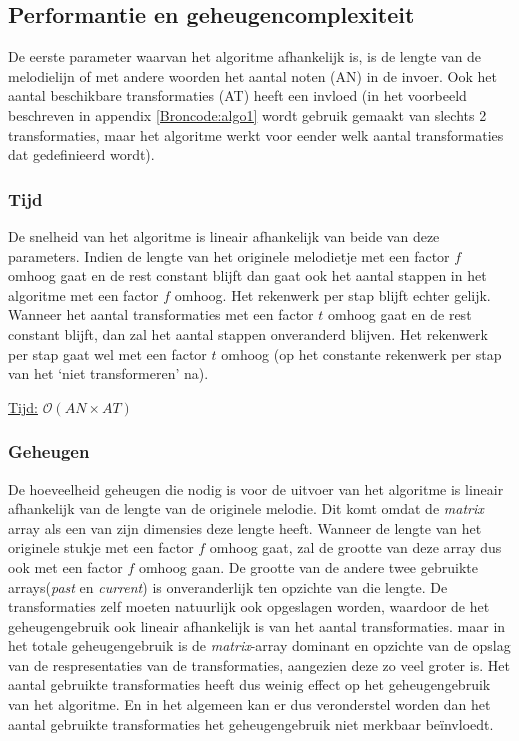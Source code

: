 \subsection{Performantie en geheugencomplexiteit}
De eerste parameter waarvan het algoritme afhankelijk is, is de lengte van de melodielijn of met andere woorden het aantal noten (AN) in de invoer. Ook het aantal beschikbare transformaties (AT) heeft een invloed (in het voorbeeld beschreven in appendix \ref{Broncode:algo1} wordt gebruik gemaakt van slechts 2 transformaties, maar het algoritme werkt voor eender welk aantal transformaties dat gedefinieerd wordt).

\subsubsection{Tijd} 
De snelheid van het algoritme is lineair afhankelijk van beide van deze parameters. Indien de lengte van het originele melodietje met een factor $f$ omhoog gaat en de rest constant blijft dan gaat ook het aantal stappen in het algoritme met een factor $f$ omhoog. Het rekenwerk per stap blijft echter gelijk. Wanneer het aantal transformaties met een factor $t$ omhoog gaat en de rest constant blijft, dan zal het aantal stappen onveranderd blijven. Het rekenwerk per stap gaat wel met een factor $t$ omhoog (op het constante rekenwerk per stap van het `niet transformeren' na).

\begin{center}
\underline{Tijd:} $\mathcal{O}(AN \times AT)$
\end{center}

\subsubsection{Geheugen}
De hoeveelheid geheugen die nodig is voor de uitvoer van het algoritme is lineair afhankelijk van de lengte van de originele melodie. Dit komt omdat de \textit{matrix} array als een van zijn dimensies deze lengte heeft. Wanneer de lengte van het originele stukje met een factor $f$ omhoog gaat, zal de grootte van deze array dus ook met een factor $f$ omhoog gaan. De grootte van de andere twee gebruikte arrays(\textit{past} en \textit{current}) is onveranderlijk ten opzichte van die lengte. De transformaties zelf moeten natuurlijk ook opgeslagen worden, waardoor de het geheugengebruik ook lineair afhankelijk is van het aantal transformaties. maar in het totale geheugengebruik is de \textit{matrix}-array dominant en opzichte van de opslag van de respresentaties van de transformaties, aangezien deze zo veel groter is. Het aantal gebruikte transformaties heeft dus weinig effect op het geheugengebruik van het algoritme. En in het algemeen kan er dus veronderstel worden dan het aantal gebruikte transformaties het geheugengebruik niet merkbaar be\"invloedt.

